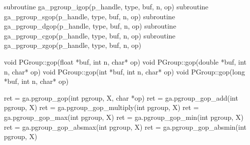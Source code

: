 \documentclass[12pt]{article}
\begin{document}
\begin{fapi}
\begin{fcode}
subroutine ga_pgroup_igop(p_handle, type, buf, n, op)
subroutine ga_pgroup_sgop(p_handle, type, buf, n, op)
subroutine ga_pgroup_dgop(p_handle, type, buf, n, op)
subroutine ga_pgroup_cgop(p_handle, type, buf, n, op)
subroutine ga_pgroup_zgop(p_handle, type, buf, n, op)
\end{fcode}
\begin{funcargs}
\end{funcargs}
\end{fapi}

\begin{cxxapi}
\begin{cxxcode}
void PGroup::gop(float *buf, int n, char* op)
void PGroup::gop(double *buf, int n, char* op)
void PGroup::gop(int *buf, int n, char* op)
void PGroup::gop(long *buf, int n, char* op)
\end{cxxcode}
\begin{funcargs}
\end{funcargs}
\end{cxxapi}

\begin{pyapi}
\begin{pycode}
ret = ga.pgroup_gop(int pgroup, X, char *op)
ret = ga.pgroup_gop_add(int pgroup, X)
ret = ga.pgroup_gop_multiply(int pgroup, X)
ret = ga.pgroup_gop_max(int pgroup, X)
ret = ga.pgroup_gop_min(int pgroup, X)
ret = ga.pgroup_gop_absmax(int pgroup, X)
ret = ga.pgroup_gop_absmin(int pgroup, X)
\end{pycode}
\begin{funcargs}
\end{funcargs}
\end{pyapi}

\gcoll
\end{document}
